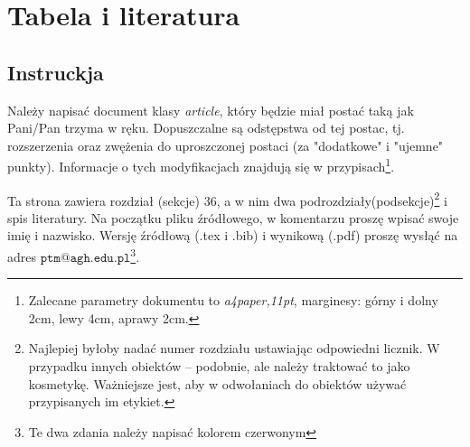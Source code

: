 \documentclass[a4paper, 11pt]{article}
\begin{document}
%
\pagestyle{fancy}
\section{Tabela i literatura}
\label{title}

\subsection{Instruckja}

Należy napisać document klasy {\em article}, który będzie miał postać taką jak Pani/Pan trzyma w ręku. Dopuszczalne są odstępstwa od tej postac, tj. rozszerzenia oraz zwężenia do uproszczonej postaci (za "dodatkowe" i "ujemne" punkty). Informacje o tych modyfikacjach znajdują się w przypisach\footnote{Zalecane parametry dokumentu to {\em a4paper,11pt}, marginesy: górny i dolny 2cm, lewy 4cm, aprawy 2cm.}.

Ta strona zawiera rozdział (sekcje) 36, a w nim dwa podrozdziały(podsekcje)\footnote{Najlepiej byłoby nadać numer rozdziału ustawiając odpowiedni licznik. W przypadku innych obiektów -- podobnie, ale należy traktować to jako kosmetykę. Ważniejsze jest, aby w odwołaniach do obiektów używać przypisanych im etykiet.} i spis literatury. Na początku pliku źródłowego, w komentarzu proszę wpisać swoje imię i nazwisko. Wersję źródłową (.tex i .bib) i wynikową (.pdf) proszę wysłąć na adres $\mathtt{ptm@agh.edu.pl}$\footnote{Te dwa zdania należy napisać kolorem czerwonym}.
\end{document}
